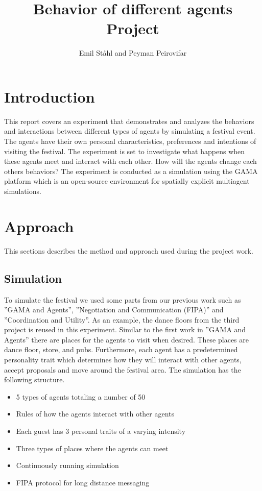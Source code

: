 \documentclass[a4paper,10pt]{article}
\title{\textbf{Behavior of different agents} \\ 
\textbf{Project}}
\author{Emil Ståhl and Peyman Peirovifar}
\begin{document}
\maketitle

\section{Introduction}
This report covers an experiment that demonstrates and analyzes the behaviors and interactions between different types of 
agents by simulating a festival event. The agents have their own personal characteristics, preferences and intentions of 
visiting the festival. The experiment is set to investigate what happens when these agents meet and interact with each other. How will the agents change each others behaviors?
The experiment is conducted as a simulation using the GAMA platform which is an open-source environment for spatially 
explicit multiagent simulations. 


\maketitle
\section{Approach}
This sections describes the method and approach used during the project work. 

\maketitle
\subsection{Simulation}
To simulate the festival we used some parts from our previous work such as ”GAMA and Agents”, ”Negotiation and Communication 
(FIPA)” and ”Coordination and Utility”. As an example, the dance floors from the third project is reused in this experiment. 
Similar to the first work in ”GAMA and Agents” there are places for the agents to visit when desired. These places are dance 
floor, store,  and pubs. Furthermore, each agent has a predetermined personality trait which determines how they will 
interact with other agents, accept proposals and move around the festival area. 
The simulation has the following structure.

\begin{itemize}
    \item 5 types of agents totaling a number of 50 
    \item Rules of how the agents interact with other agents
    \item Each guest has 3 personal traits of a varying intensity
    \item Three types of places where the agents can meet
    \item Continuously running simulation
    \item FIPA protocol for long distance messaging
\end{itemize}
\end{document}

